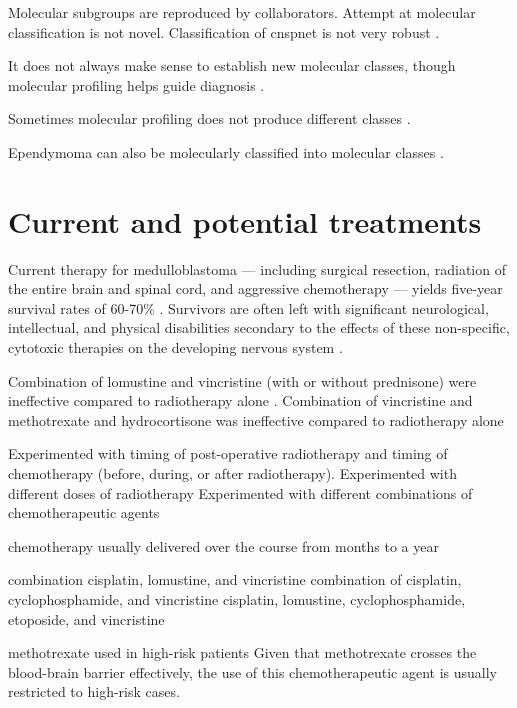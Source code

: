Molecular subgroups are reproduced by collaborators.
Attempt at molecular classification is not novel. Classification of \gls{cnspnet} is not very robust .

It does not always make sense to establish new molecular classes, though molecular profiling helps guide diagnosis .

Sometimes molecular profiling does not produce different classes .

Ependymoma can also be molecularly classified into molecular classes .


\section{Current and potential treatments}


Current therapy for medulloblastoma --- including surgical resection, radiation of the entire brain and spinal cord, and aggressive chemotherapy --- yields five-year survival rates of 60-70\% . Survivors are often left with significant neurological, intellectual, and physical disabilities secondary to the effects of these non-specific, cytotoxic therapies on the developing nervous system .

Combination of lomustine and vincristine (with or without prednisone) were ineffective compared to radiotherapy alone .
Combination of vincristine and methotrexate and hydrocortisone was ineffective compared to radiotherapy alone 


Experimented with timing of post-operative radiotherapy and timing of chemotherapy (before, during, or after radiotherapy).
Experimented with different doses of radiotherapy
Experimented with different combinations of chemotherapeutic agents

chemotherapy
usually delivered over the course from months to a year

combination cisplatin, lomustine, and vincristine 
combination of cisplatin, cyclophosphamide, and vincristine
cisplatin, lomustine, cyclophosphamide, etoposide, and vincristine

methotrexate used in high-risk patients
Given that methotrexate crosses the blood-brain barrier effectively, the use of this chemotherapeutic agent is usually restricted to high-risk cases.

